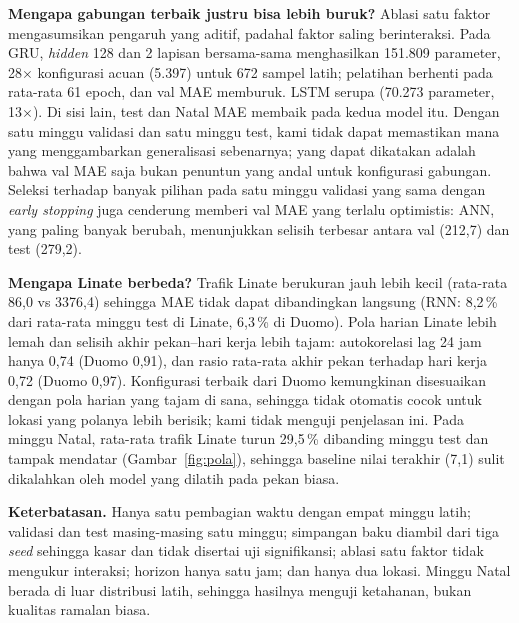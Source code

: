 \documentclass[conference,a4paper]{IEEEtran}
\begin{document}
\textbf{Mengapa gabungan terbaik justru bisa lebih buruk?} Ablasi satu faktor mengasumsikan pengaruh yang aditif, padahal faktor saling berinteraksi. Pada GRU, \textit{hidden} 128 dan 2 lapisan bersama-sama menghasilkan 151.809 parameter, 28$\times$ konfigurasi acuan (5.397) untuk 672 sampel latih; pelatihan berhenti pada rata-rata 61 epoch, dan val MAE memburuk. LSTM serupa (70.273 parameter, 13$\times$). Di sisi lain, test dan Natal MAE membaik pada kedua model itu. Dengan satu minggu validasi dan satu minggu test, kami tidak dapat memastikan mana yang menggambarkan generalisasi sebenarnya; yang dapat dikatakan adalah bahwa val MAE saja bukan penuntun yang andal untuk konfigurasi gabungan. Seleksi terhadap banyak pilihan pada satu minggu validasi yang sama dengan \textit{early stopping} juga cenderung memberi val MAE yang terlalu optimistis: ANN, yang paling banyak berubah, menunjukkan selisih terbesar antara val (212,7) dan test (279,2).

\textbf{Mengapa Linate berbeda?} Trafik Linate berukuran jauh lebih kecil (rata-rata 86,0 vs 3376,4) sehingga MAE tidak dapat dibandingkan langsung (RNN: 8,2\,\% dari rata-rata minggu test di Linate, 6,3\,\% di Duomo). Pola harian Linate lebih lemah dan selisih akhir pekan--hari kerja lebih tajam: autokorelasi lag 24 jam hanya 0,74 (Duomo 0,91), dan rasio rata-rata akhir pekan terhadap hari kerja 0,72 (Duomo 0,97). Konfigurasi terbaik dari Duomo kemungkinan disesuaikan dengan pola harian yang tajam di sana, sehingga tidak otomatis cocok untuk lokasi yang polanya lebih berisik; kami tidak menguji penjelasan ini. Pada minggu Natal, rata-rata trafik Linate turun 29,5\,\% dibanding minggu test dan tampak mendatar (Gambar~\ref{fig:pola}), sehingga baseline nilai terakhir (7,1) sulit dikalahkan oleh model yang dilatih pada pekan biasa.

\textbf{Keterbatasan.} Hanya satu pembagian waktu dengan empat minggu latih; validasi dan test masing-masing satu minggu; simpangan baku diambil dari tiga \textit{seed} sehingga kasar dan tidak disertai uji signifikansi; ablasi satu faktor tidak mengukur interaksi; horizon hanya satu jam; dan hanya dua lokasi. Minggu Natal berada di luar distribusi latih, sehingga hasilnya menguji ketahanan, bukan kualitas ramalan biasa.

\end{document}
